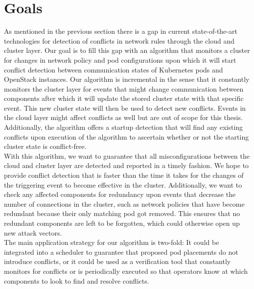 \section{Goals} \label{sec:goals}
As mentioned in the previous section there is a gap in current state-of-the-art technologies for detection of conflicts in network rules through the cloud and cluster layer. Our goal is to fill this gap with an algorithm that monitors a cluster for changes in network policy and pod configurations upon which it will start conflict detection between communication states of Kubernetes pods and OpenStack instances. Our algorithm is incremental in the sense that it constantly monitors the cluster layer for events that might change communication between components after which it will update the stored cluster state with that specific event. This new cluster state will then be used to detect new conflicts. Events in the cloud layer might affect conflicts as well but are out of scope for this thesis. Additionally, the algorithm offers a startup detection that will find any existing conflicts upon execution of the algorithm to ascertain whether or not the starting cluster state is conflict-free.
\\[10pt]

With this algorithm, we want to guarantee that all misconfigurations between the cloud and cluster layer are detected and reported in a timely fashion. We hope to provide conflict detection that is faster than the time it takes for the changes of the triggering event to become effective in the cluster. Additionally, we want to check any affected components for redundancy upon events that decrease the number of connections in the cluster, such as network policies that have become redundant because their only matching pod got removed. This ensures that no redundant components are left to be forgotten, which could otherwise open up new attack vectors.
\\[10pt]

The main application strategy for our algorithm is two-fold: It could be integrated into a scheduler to guarantee that proposed pod placements do not introduce conflicts, or it could be used as a verification tool that constantly monitors for conflicts or is periodically executed so that operators know at which components to look to find and resolve conflicts.


